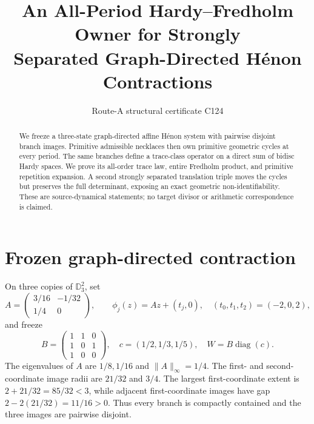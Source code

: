 \documentclass[10pt]{article}
\title{An All-Period Hardy--Fredholm Owner for Strongly\\
Separated Graph-Directed H\'enon Contractions}
\author{Route-A structural certificate C124}
\date{}
\begin{document}
\maketitle
\begin{abstract}
We freeze a three-state graph-directed affine H\'enon system with pairwise
disjoint branch images.  Primitive admissible necklaces then own primitive
geometric cycles at every period.  The same branches define a trace-class
operator on a direct sum of bidisc Hardy spaces.  We prove its all-order trace
law, entire Fredholm product, and primitive repetition expansion.  A second
strongly separated translation triple moves the cycles but preserves the full
determinant, exposing an exact geometric non-identifiability.  These are
source-dynamical statements; no target divisor or arithmetic correspondence is
claimed.
\end{abstract}

\section{Frozen graph-directed contraction}
On three copies of $\mathbb D_3^2$, set
\[
A=\begin{pmatrix}3/16&-1/32\\1/4&0\end{pmatrix},\qquad
\phi_j(z)=Az+(t_j,0),\quad (t_0,t_1,t_2)=(-2,0,2),
\]
and freeze
\[
B=\begin{pmatrix}1&1&0\\1&0&1\\1&0&0\end{pmatrix},\quad
c=(1/2,1/3,1/5),\quad
W=B\operatorname{diag}(c).
\]
The eigenvalues of $A$ are $1/8,1/16$ and $\|A\|_\infty=1/4$.
The first- and second-coordinate image radii are $21/32$ and $3/4$.
The largest first-coordinate extent is $2+21/32=85/32<3$, while
adjacent first-coordinate images have gap
$2-2(21/32)=11/16>0$.  Thus every branch is compactly contained and
the three images are pairwise disjoint.
\end{document}
